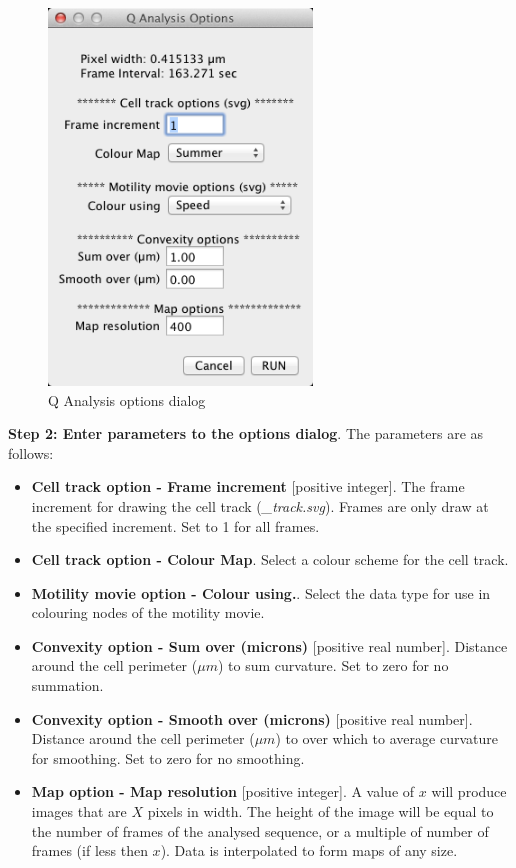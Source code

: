 \documentclass[a4paper,12pt]{article}
\begin{document}
\begin{figure}[ht]
   \centering
   \includegraphics[height=10cm]{screenQAnalysis.png} 
   \caption{Q Analysis options dialog}
   \label{screenQAnalysis}
\end{figure}

\textbf{Step 2: Enter parameters to the options dialog}.  The parameters are as follows:

\begin{itemize}

\item \textbf{Cell track option - Frame increment}  [positive integer].  The frame increment for drawing the
cell track (\textit{\_track.svg}).  Frames are only draw at the specified increment.  Set to 1 for all frames.  
\item \textbf{Cell track option - Colour Map}.  Select a colour scheme for the cell track.
\item \textbf{Motility movie option - Colour using.}. Select the data type for use in colouring nodes of the motility movie.
\item \textbf{Convexity option - Sum over (microns)} [positive real number].  Distance around the cell 
perimeter ($\mu m$) to sum curvature. Set to zero for no summation.
\item \textbf{Convexity option - Smooth over (microns)} [positive real number].  Distance around the cell 
perimeter ($\mu m$) to over which to average curvature for smoothing. Set to zero for no smoothing.
\item \textbf{Map option - Map resolution} [positive integer]. A value of $x$ will produce images that are
$X$ pixels in width.  The height of the image will be equal to the number of frames of the analysed sequence,
or a multiple of number of frames (if less then $x$). Data is interpolated to form maps of any size.
\end{itemize}
\end{document}
